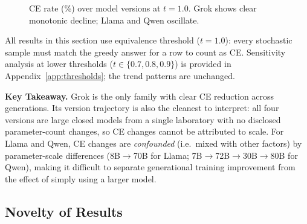 \documentclass[12pt,twocolumn]{article}
\begin{document}
\begin{figure}[H]
\centering
{}
\caption{CE rate (\%) over model versions at $t{=}1.0$. Grok shows
clear monotonic decline; Llama and Qwen oscillate.}
\label{fig:timeline}
\end{figure}

All results in this section use equivalence threshold
($t{=}1.0$): every stochastic sample must match the greedy answer for
a row to count as CE. Sensitivity analysis at lower thresholds
($t \in \{0.7, 0.8, 0.9\}$) is provided in
Appendix~\ref{app:thresholds}; the trend patterns are unchanged.

\textbf{Key Takeaway.}
Grok is the only family with clear CE reduction across generations.
Its version trajectory is also the cleanest to interpret: all four
versions are large closed models from a single laboratory with no
disclosed parameter-count changes, so CE changes cannot be attributed
to scale. For Llama and Qwen, CE changes are \emph{confounded}
(i.e.\ mixed with other factors) by parameter-scale differences
(8B$\to$70B for Llama; 7B$\to$72B$\to$30B$\to$80B for Qwen),
making it difficult to separate generational training improvement
from the effect of simply using a larger model.

\subsection{Novelty of Results}
\label{sec:results-novelty}
\end{document}
